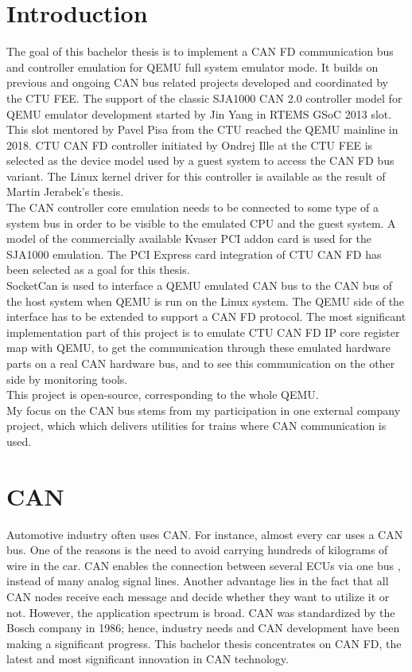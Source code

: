 \documentclass{ctuthesis}
\begin{document}
\chapter{Introduction}
 The goal of this bachelor thesis is to implement a CAN FD communication bus and controller emulation for QEMU full system emulator mode. It builds on previous and ongoing CAN bus related projects developed and coordinated by the CTU FEE. The support of the classic SJA1000 CAN 2.0 controller model for QEMU emulator development started by Jin Yang in RTEMS GSoC 2013 slot. This slot mentored by Pavel Pisa from the CTU reached the QEMU mainline in 2018. \cite{qemu-mainline} CTU CAN FD controller \cite{ctu-canfd-core} initiated by Ondrej Ille at the CTU FEE is selected as the device model used by a guest system to access the CAN FD bus variant. The Linux kernel driver for this controller is available as the result of Martin Jerabek's thesis. \cite{ctu-canfd} \\
 The CAN controller core emulation needs to be connected to some type of a system bus in order to be visible to the emulated CPU and the guest system. A model of the commercially available Kvaser PCI addon card is used for the SJA1000 emulation. The PCI Express card integration of CTU CAN FD \cite{ctu-project} has been selected as a goal for this thesis. \\
 SocketCan is used to interface a QEMU emulated CAN bus to the CAN bus of the host system when QEMU is run on the Linux system. The QEMU side of the interface has to be extended to support a CAN FD protocol.
The most significant implementation part of this project is to emulate CTU CAN FD IP core register map \cite{progdum} with QEMU, to get the communication through these emulated hardware parts on a real CAN hardware bus, and to see this communication on the other side by monitoring tools. \\
This project is open-source, corresponding to the whole QEMU. \\
My focus on the CAN bus stems from my participation in one external company project, which which delivers utilities for trains where CAN communication is used.

\chapter{CAN}
 Automotive industry often uses CAN.  For instance, almost every car uses a CAN bus. One of the reasons is the need to avoid carrying hundreds of kilograms of wire in the car. CAN enables the connection between several ECUs via one bus \cite{ECUs}, instead of many analog signal lines. Another advantage lies in the fact that all CAN nodes receive each message and decide whether they want to utilize it or not. However, the application spectrum is broad. CAN was standardized by the Bosch company in 1986; hence, industry needs and CAN development have been making a significant progress. This bachelor thesis concentrates on CAN FD, the latest and most significant innovation in CAN technology.
\end{document}
